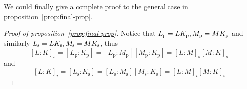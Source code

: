 \documentclass[a4paper]{article}
\theoremstyle{mystyle}
\theoremstyle{remark}
\theoremstyle{definition}
\theoremstyle{definition}
\begin{document}
  We could finally give a complete proof to the general case in proposition~\ref{prop:final-prop}.

  \begin{proof}[Proof of proposition~\ref{prop:final-prop}]
    Notice that $L_\mathrm{p} = L K_\mathrm{p}, M_\mathrm{p} = M K_\mathrm{p}$ and similarly
    $L_\mathrm{s} = L K_\mathrm{s}, M_\mathrm{s} = M K_\mathrm{s}$, thus
    \[ [L: K]_s = [L_\mathrm{p}: K_\mathrm{p}] = 
      [L_\mathrm{p}: M_\mathrm{p}][M_\mathrm{p}: K_\mathrm{p}] = [L: M]_s [M: K]_s \]
    and
    \[ [L: K]_i = [L_\mathrm{s}: K_\mathrm{s}] = 
      [L_\mathrm{s}: M_\mathrm{s}][M_\mathrm{s}: K_\mathrm{s}] = [L: M]_i [M: K]_i \]
  \end{proof}
\end{document}

